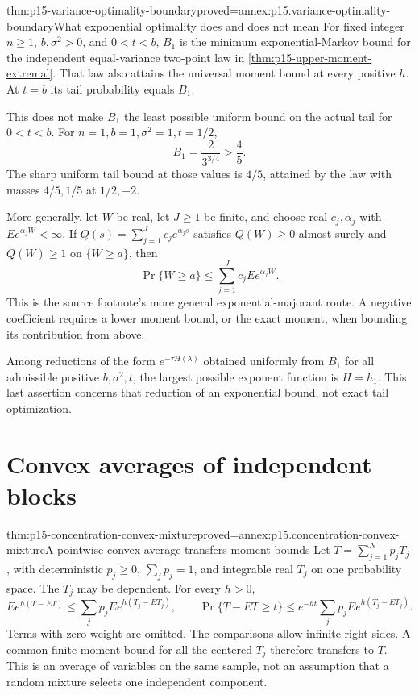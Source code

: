 \begin{hbtheorem}{thm:p15-variance-optimality-boundary}{proved=annex:p15.variance-optimality-boundary}{What exponential optimality does and does not mean}
For fixed integer \(n\geq1\), \(b,\sigma^2>0\), and \(0<t<b\),
\(B_1\) is the minimum exponential-Markov
bound for the independent equal-variance two-point law in
\cref{thm:p15-upper-moment-extremal}. That law also attains the universal
moment bound at every positive \(h\). At \(t=b\) its tail probability
equals \(B_1\).

This does not make \(B_1\) the least possible uniform bound on the actual
tail for \(0<t<b\). For \(n=1,b=1,\sigma^2=1,t=1/2\),
\[
 B_1=\frac{2}{3^{3/4}}>\frac45.
\]
The sharp uniform tail bound at those values is \(4/5\), attained by
the law with masses \(4/5,1/5\) at \(1/2,-2\).

More generally, let \(W\) be real, let \(J\geq1\) be finite, and choose
real \(c_j,\alpha_j\) with \(Ee^{\alpha_jW}<\infty\).
If \(Q(s)=\sum_{j=1}^Jc_je^{\alpha_js}\) satisfies
\(Q(W)\geq0\) almost surely and \(Q(W)\geq1\) on \(\{W\geq a\}\),
then
\[
 \Pr\{W\geq a\}\leq\sum_{j=1}^Jc_jEe^{\alpha_jW}.
\]
This is the source footnote's more general exponential-majorant route.
A negative coefficient requires a lower moment bound, or the exact
moment, when bounding its contribution from above.

Among reductions of the form \(e^{-\tau H(\lambda)}\) obtained uniformly
from \(B_1\) for all admissible positive \(b,\sigma^2,t\), the largest
possible exponent function is \(H=h_1\). This last assertion concerns
that reduction of an exponential bound, not exact tail optimization.
\end{hbtheorem}

\section{Convex averages of independent blocks}
\label{sec:p15-dependent-blocks}

\begin{hblemma}{thm:p15-concentration-convex-mixture}{proved=annex:p15.concentration-convex-mixture}{A pointwise convex average transfers moment bounds}
Let \(T=\sum_{j=1}^Np_jT_j\), with deterministic \(p_j\geq0\),
\(\sum_jp_j=1\), and integrable real \(T_j\) on one probability space.
The \(T_j\) may be dependent. For every \(h>0\),
\[
 E e^{h(T-ET)}
 \leq\sum_jp_j E e^{h(T_j-ET_j)},\qquad
 \Pr\{T-ET\geq t\}
 \leq e^{-ht}\sum_jp_j E e^{h(T_j-ET_j)}.
\]
Terms with zero weight are omitted. The comparisons allow infinite right
sides. A common finite moment
bound for all the centered \(T_j\) therefore transfers to \(T\).
This is an average of variables on the same sample, not an assumption
that a random mixture selects one independent component.
\end{hblemma}


